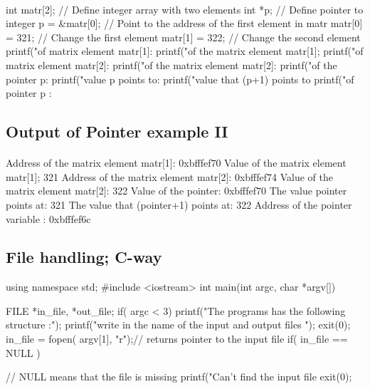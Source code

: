 \documentclass[%
oneside,                 %
final,                   %
10pt]{article}
\begin{document}
{{{{{{\paragraph{}
\bcppcod
int matr[2];    // Define integer array with two elements
int *p;         // Define pointer to integer
p = &matr[0];   // Point to the address of the first element in matr
matr[0] = 321;  // Change the first element
matr[1] = 322;  // Change the second element
printf("\nAddress of matrix element matr[1]: %
printf("\nValue of the  matrix element  matr[1]; %
printf("\nAddress of matrix element matr[2]: %
printf("\nValue of the matrix element  matr[2]: %
printf("\nValue of the pointer p: %
printf("\nThe value p points to: %
printf("\nThe value that (p+1) points to  %
printf("\nAddress of pointer p : %
\ecppcod




\subsection{Output of Pointer example II}


\paragraph{}
\bccq
Address of the matrix element matr[1]: 0xbfffef70
Value of the  matrix element  matr[1]; 321
Address of the matrix element matr[2]: 0xbfffef74
Value of the matrix element  matr[2]: 322
Value of the pointer: 0xbfffef70
The value pointer points at: 321
The value that (pointer+1) points at:  322
Address of the pointer variable : 0xbfffef6c
\eccq



\subsection{File handling; C-way}

\bcppcod
using namespace std;
#include <iostream>
int main(int argc, char *argv[])
{
  FILE *in_file, *out_file;
  if( argc < 3)  {
    printf("The programs has the following structure :\n");
    printf("write in the name of the input and output files \n");
    exit(0);
  }
  in_file = fopen( argv[1], "r");// returns pointer to the  input file
  if( in_file == NULL )  { // NULL means that the file is missing
    printf("Can't find the input file %
    exit(0);
\ecppcod

}}}}}}}}
\end{document}
